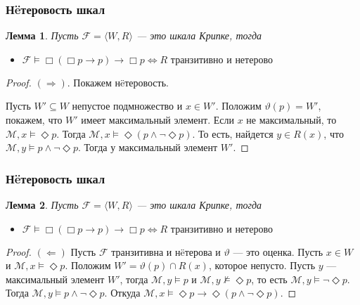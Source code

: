 \documentclass[pdf,utf8,russian,aspectratio=169]{beamer}
\newtheorem{lem}{Лемма}
\begin{document}
\begin{frame}
  \frametitle{Н\"{e}теровость шкал}
\begin{lem}
  Пусть $\mathcal{F} = \langle W, R \rangle$ --- это шкала Крипке, тогда

\begin{itemize}
  \item $\mathcal{F} \models \Box (\Box p \to p) \to \Box p \Leftrightarrow R \text{ транзитивно и н\"{е}терово}$
\end{itemize}
\end{lem}

\begin{proof}
  $(\Rightarrow)$. Покажем н\"{e}теровость.

  Пусть $W' \subseteq W$ непустое подмножество и $x \in W'$. Положим $\vartheta(p) = W'$, покажем, что $W'$ имеет максимальный элемент. Если $x$ не максимальный, то $\mathcal{M}, x \models \Diamond p$. Тогда $\mathcal{M}, x \models \Diamond (p \land \neg \Diamond p)$. То есть, найдется $y \in R(x)$, что $\mathcal{M}, y \models p \land \neg \Diamond p$. Тогда $у$ максимальный элемент $W'$.

\end{proof}
\end{frame}

\begin{frame}
  \frametitle{Н\"{e}теровость шкал}

  \begin{lem}
    Пусть $\mathcal{F} = \langle W, R \rangle$ --- это шкала Крипке, тогда

  \begin{itemize}
    \item $\mathcal{F} \models \Box (\Box p \to p) \to \Box p \Leftrightarrow R \text{ транзитивно и н\"{е}терово}$
  \end{itemize}
\end{lem}

\begin{proof}
  $(\Leftarrow)$ Пусть $\mathcal{F}$ транзитивна и н\"{e}терова и $\vartheta$ --- это оценка. Пусть $x \in W$ и $\mathcal{M}, x \models \Diamond p$.
  Положим $W' = \vartheta(p) \cap R(x)$, которое непусто. Пусть $y$ --- максимальный элемент $W'$, тогда $\mathcal{M}, y \models p$ и
  $\mathcal{M}, y \nvDash \Diamond p$, то есть $\mathcal{M}, y \models \neg \Diamond p$.
  Тогда $\mathcal{M}, y \models p \land \neg \Diamond p$.
  Откуда $\mathcal{M}, x \models \Diamond p \to \Diamond (p \land \neg \Diamond p)$.
\end{proof}
\end{frame}
\end{document}

